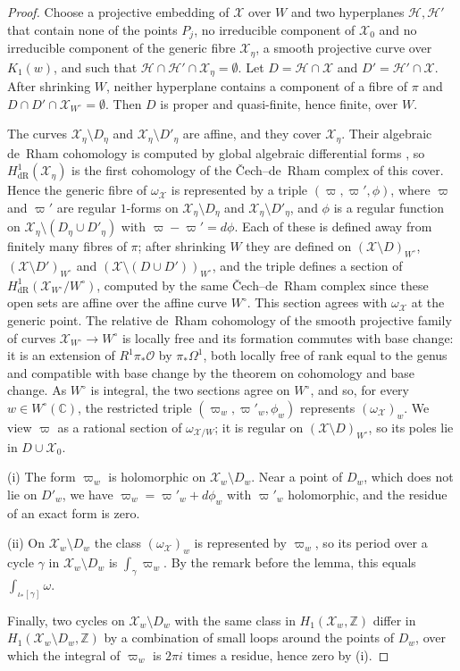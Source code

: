 \documentclass[11pt]{amsart}
\theoremstyle{definition}
\theoremstyle{remark}
\numberwithin{equation}{section}
\newcommand{\Z}{\mathbb{Z}}
\newcommand{\C}{\mathbb{C}}
\newcommand{\cX}{\mathcal{X}}
\newcommand{\cO}{\mathcal{O}}
\begin{document}
\begin{proof}
Choose a projective embedding of $\cX$ over $W$ and two hyperplanes $\mathcal H,\mathcal H'$ that contain none of the points $P_j$, no irreducible component of $\cX_0$ and no irreducible component of the generic fibre $\cX_\eta$, a smooth projective curve over $K_1(w)$, and such that $\mathcal H\cap\mathcal H'\cap\cX_\eta=\emptyset$. Let $D=\mathcal H\cap\cX$ and $D'=\mathcal H'\cap\cX$. After shrinking $W$, neither hyperplane contains a component of a fibre of $\pi$ and $D\cap D'\cap\cX_{W^\circ}=\emptyset$. Then $D$ is proper and quasi-finite, hence finite, over $W$.

The curves $\cX_\eta\setminus D_\eta$ and $\cX_\eta\setminus D'_\eta$ are affine, and they cover $\cX_\eta$. Their algebraic de~Rham cohomology is computed by global algebraic differential forms \citep{Grothendieck1966}, so $H^1_{\mathrm{dR}}(\cX_\eta)$ is the first cohomology of the \v{C}ech--de~Rham complex of this cover. Hence the generic fibre of $\omega_\cX$ is represented by a triple $(\varpi,\varpi',\phi)$, where $\varpi$ and $\varpi'$ are regular $1$-forms on $\cX_\eta\setminus D_\eta$ and $\cX_\eta\setminus D'_\eta$, and $\phi$ is a regular function on $\cX_\eta\setminus(D_\eta\cup D'_\eta)$ with $\varpi-\varpi'=d\phi$. Each of these is defined away from finitely many fibres of $\pi$; after shrinking $W$ they are defined on $(\cX\setminus D)_{W^\circ}$, $(\cX\setminus D')_{W^\circ}$ and $(\cX\setminus(D\cup D'))_{W^\circ}$, and the triple defines a section of $H^1_{\mathrm{dR}}(\cX_{W^\circ}/W^\circ)$, computed by the same \v{C}ech--de~Rham complex since these open sets are affine over the affine curve $W^\circ$. This section agrees with $\omega_\cX$ at the generic point. The relative de~Rham cohomology of the smooth projective family of curves $\cX_{W^\circ}\to W^\circ$ is locally free and its formation commutes with base change: it is an extension of $R^1\pi_*\cO$ by $\pi_*\Omega^1$, both locally free of rank equal to the genus and compatible with base change by the theorem on cohomology and base change. As $W^\circ$ is integral, the two sections agree on $W^\circ$, and so, for every $w\in W^\circ(\C)$, the restricted triple $(\varpi_w,\varpi'_w,\phi_w)$ represents $(\omega_\cX)_w$. We view $\varpi$ as a rational section of $\omega_{\cX/W}$; it is regular on $(\cX\setminus D)_{W^\circ}$, so its poles lie in $D\cup\cX_0$.

(i) The form $\varpi_w$ is holomorphic on $\cX_w\setminus D_w$. Near a point of $D_w$, which does not lie on $D'_w$, we have $\varpi_w=\varpi'_w+d\phi_w$ with $\varpi'_w$ holomorphic, and the residue of an exact form is zero.

(ii) On $\cX_w\setminus D_w$ the class $(\omega_\cX)_w$ is represented by $\varpi_w$, so its period over a cycle $\gamma$ in $\cX_w\setminus D_w$ is $\int_\gamma\varpi_w$. By the remark before the lemma, this equals $\int_{\iota_*[\gamma]}\omega$.

Finally, two cycles on $\cX_w\setminus D_w$ with the same class in $H_1(\cX_w,\Z)$ differ in $H_1(\cX_w\setminus D_w,\Z)$ by a combination of small loops around the points of $D_w$, over which the integral of $\varpi_w$ is $2\pi i$ times a residue, hence zero by (i).
\end{proof}
\end{document}
